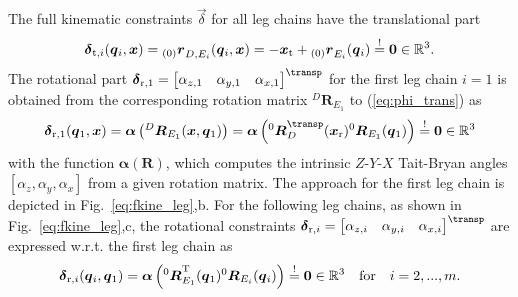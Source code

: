 \documentclass[
	graybox,
	vecphys] %
	{svmult}
\newcommand{\bm}[1]{\boldsymbol{#1}}
\newcommand{\ortvek}[4]{{ }_{(#1)}{\boldsymbol{#2}}^{#3}_{#4} }
\newcommand{\rotmat}[2]{{{ }^{#1}\boldsymbol{R}}_{#2}}
\newcommand{\Res}[0]{\vec{\delta}}
\begin{document}
The full kinematic constraints $\Res$ for all leg chains have the translational part
%
\vspace{-0.1cm}
\begin{equation}
\Res_{\mathrm{t},i}(\vec{q}_i,\vec{x})
=
\ortvek{0}{r}{}{D,E_i}(\vec{q}_i,\vec{x})
=
- \vec{x}_{\mathrm{t}} + \ortvek{0}{r}{}{E_i}(\vec{q}_i) 
\overset{!}{=}
\vec{0}
\in {\mathbb{R}}^{3}
\label{eq:phi_trans}.
\vspace{-0.1cm}
\end{equation}
%
The rotational part 
$\Res_{\mathrm{r},1}
=
\begin{bmatrix}
\alpha_{z,1} & \alpha_{y,1} & \alpha_{x,1}
\end{bmatrix}^\transp$ 
for the first leg chain $i=1$ is obtained from the corresponding rotation matrix $\rotmat{D}{E_1}$ to (\ref{eq:phi_trans}) as
%
\vspace{-0.1cm}
\begin{equation}
\Res_{\mathrm{r},1}(\vec{q}_1,\vec{x})
=
\bm{\alpha}\left(\rotmat{D}{E_1}(\vec{x},\vec{q}_1)\right)
=
\bm{\alpha}\left(\rotmat{0}{D}^\transp (\vec{x}_{\mathrm{r}})\rotmat{0}{E_1}(\vec{q}_1)\right) 
\overset{!}{=}
\vec{0}
\in {\mathbb{R}}^{3}
\label{eq:phi1_rot}
\vspace{-0.1cm}
\end{equation}
%
with the function $\bm{\alpha}(\bm{R})$, which computes the intrinsic $Z$-$Y$-$X$ Tait-Bryan angles $[\alpha_z,\alpha_y,\alpha_x]$ from a given rotation matrix.
The approach for the first leg chain is depicted in Fig.~\ref{eq:fkine_leg},b.
%
For the following leg chains, as shown in Fig.~\ref{eq:fkine_leg},c, the rotational constraints
$\Res_{\mathrm{r},i}
=
\begin{bmatrix}
\alpha_{z,i} & \alpha_{y,i} & \alpha_{x,i}
\end{bmatrix}^\transp$ 
are expressed w.r.t. the first leg chain as
%
\begin{equation}
\vspace{-0.1cm}
\Res_{\mathrm{r},i}(\vec{q}_i,\vec{q}_1)
=
\bm{\alpha}\left(\rotmat{0}{E_1}^\mathrm{T}(\vec{q}_1)\rotmat{0}{E_i}(\vec{q}_i)\right)
\overset{!}{=}
\vec{0}
\in {\mathbb{R}}^{3}
\quad \mathrm{for} \quad i=2,...,m.
\label{eq:phi2_rot}
\vspace{-0.1cm}
\end{equation}
\end{document}
